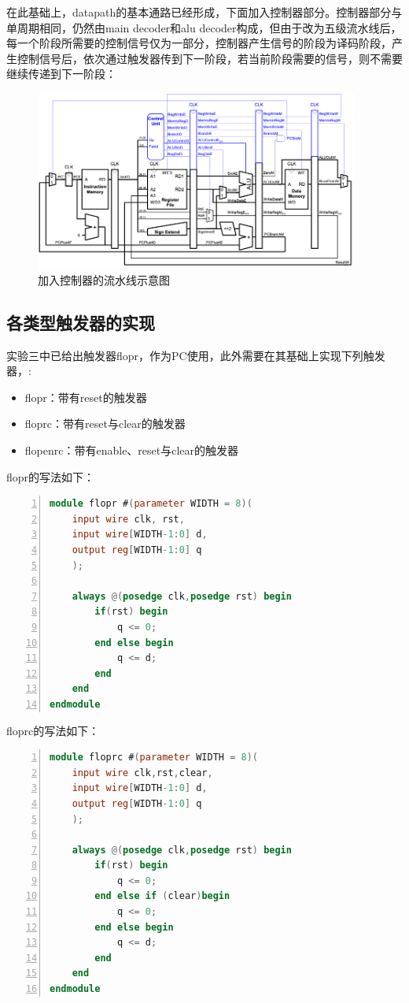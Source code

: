 在此基础上，datapath的基本通路已经形成，下面加入控制器部分。控制器部分与单周期相同，仍然由main decoder和alu decoder构成，但由于改为五级流水线后，每一个阶段所需要的控制信号仅为一部分，控制器产生信号的阶段为译码阶段，产生控制信号后，依次通过触发器传到下一阶段，若当前阶段需要的信号，则不需要继续传递到下一阶段：

\begin{figure}[htbp]
    \centering
    \includegraphics[width = 0.95\textwidth]{image/piped_with_controller.png}
    \caption{加入控制器的流水线示意图}
    \label{fig:section_2_2}
\end{figure}
\subsection{各类型触发器的实现}
实验三中已给出触发器flopr，作为PC使用，此外需要在其基础上实现下列触发器，:
\begin{itemize}
    \item flopr：带有reset的触发器
	\item floprc：带有reset与clear的触发器
	\item flopenrc：带有enable、reset与clear的触发器
\end{itemize}

flopr的写法如下：
\begin{lstlisting}[language=Verilog,label=lst:3_stage_pipeline,caption=flopr实现,numbers=left,xleftmargin=5em,xrightmargin=5em, aboveskip=2em]
module flopr #(parameter WIDTH = 8)(
	input wire clk, rst,
	input wire[WIDTH-1:0] d,
	output reg[WIDTH-1:0] q
    );

	always @(posedge clk,posedge rst) begin
		if(rst) begin
			q <= 0;
		end else begin 
			q <= d;
		end
	end
endmodule
\end{lstlisting}

floprc的写法如下：
\begin{lstlisting}[language=Verilog,caption=floprc实现,numbers=left,xleftmargin=5em,xrightmargin=5em, aboveskip=2em]
module floprc #(parameter WIDTH = 8)(
	input wire clk,rst,clear,
	input wire[WIDTH-1:0] d,
	output reg[WIDTH-1:0] q
    );

	always @(posedge clk,posedge rst) begin
		if(rst) begin
			q <= 0;
		end else if (clear)begin
			q <= 0;
		end else begin 
			q <= d;
		end
	end
endmodule
\end{lstlisting}


